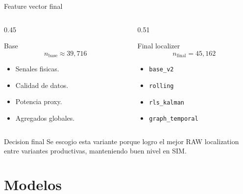\documentclass[10pt,aspectratio=169]{beamer}
\newcommand{\code}[1]{\texttt{\footnotesize #1}}
\begin{document}
\begin{frame}{Feature vector final}
\small
\begin{columns}[T,totalwidth=\textwidth]
\begin{column}{0.45\textwidth}
\begin{block}{Base}
\[
n_{\mathrm{base}} \approx 39{,}716
\]
\begin{itemize}
  \item Senales fisicas.
  \item Calidad de datos.
  \item Potencia proxy.
  \item Agregados globales.
\end{itemize}
\end{block}
\end{column}
\begin{column}{0.51\textwidth}
\begin{alertblock}{Final localizer}
\[
n_{\mathrm{final}} = 45{,}162
\]
\begin{itemize}
  \item \code{base\_v2}
  \item \code{rolling}
  \item \code{rls\_kalman}
  \item \code{graph\_temporal}
\end{itemize}
\end{alertblock}
\end{column}
\end{columns}
\vspace{2mm}
\begin{exampleblock}{Decision final}
Se escogio esta variante porque logro el mejor RAW localization entre variantes productivas, manteniendo buen nivel en SIM.
\end{exampleblock}
\end{frame}

\section{Modelos}
\end{document}
